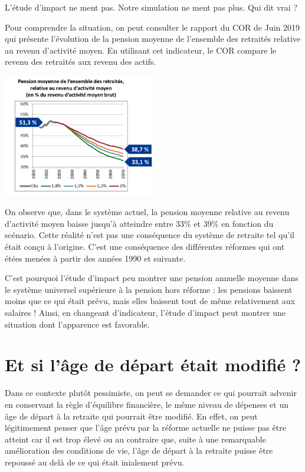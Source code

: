 \documentclass[10pt]{article}
\begin{document}
L'étude d'impact ne ment pas. 
Notre simulation ne ment pas plus. 
Qui dit vrai ?

Pour comprendre la situation, on peut consulter le rapport du COR de Juin 2019 qui 
présente l'évolution de la pension moyenne de l'ensemble des retraités relative 
au revenu d'activité moyen. 
En utilisant cet indicateur, le COR compare le revenu des retraités aux revenu des 
actifs. 

\begin{center}
\includegraphics[width=0.5\textwidth]{COR-Juin-2019-P.png}
\end{center}

On observe que, dans le système actuel, la pension moyenne relative au revenu d'activité 
moyen baisse jusqu'à atteindre entre 33\% et 39\% en fonction du scénario. 
Cette réalité n'est pas une conséquence du système de retraite tel qu'il était conçu 
à l'origine. 
C'est une conséquence des différentes réformes qui ont étées menées 
à partir des années 1990 et suivante. 

C'est pourquoi l'étude d'impact peu montrer une pension annuelle moyenne 
dans le système universel supérieure à la pension hors réforme : 
les pensions baissent moins que ce qui était prévu, mais elles baissent 
tout de même relativement aux salaires ! 
Ainsi, en changeant d'indicateur, l'étude d'impact peut montrer une situation 
dont l'apparence est favorable. 


\section{Et si l'âge de départ était modifié ?}

Dans ce contexte plutôt pessimiste, on peut se demander ce qui pourrait 
advenir en conservant la règle d'équilibre financière, le même niveau de dépenses 
et un âge de départ à la retraite qui pourrait être modifié. 
En effet, on peut légitimement penser que l'âge prévu par la réforme actuelle 
ne puisse pas être atteint car il est trop élevé ou au contraire que, suite à une 
remarquable amélioration des conditions de vie, l'âge de départ à la retraite 
puisse être repoussé au delà de ce qui était inialement prévu. 
\end{document}
